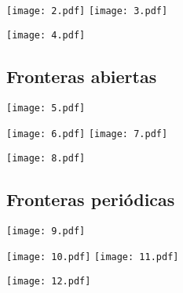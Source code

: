 \documentclass[a4paper,11pt]{article}
\begin{document}
\texttt{[image: 2.pdf]}
\texttt{[image: 3.pdf]}

\begin{center}
\texttt{[image: 4.pdf]}
\end{center}


\subsection{Fronteras abiertas}
\begin{center}
\texttt{[image: 5.pdf]}
\end{center}

\texttt{[image: 6.pdf]}
\texttt{[image: 7.pdf]}

\begin{center}
\texttt{[image: 8.pdf]}
\end{center}


\subsection{Fronteras peri\'odicas}
\begin{center}
\texttt{[image: 9.pdf]}
\end{center}

\texttt{[image: 10.pdf]}
\texttt{[image: 11.pdf]}

\begin{center}
\texttt{[image: 12.pdf]}
\end{center}
\end{document}
